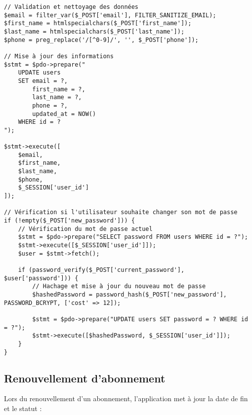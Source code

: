 \documentclass[12pt,a4paper]{report}
\begin{document}
\begin{lstlisting}[style=phpStyle, caption=Extrait de profile\_update.php - Mise à jour du profil]
// Validation et nettoyage des données
$email = filter_var($_POST['email'], FILTER_SANITIZE_EMAIL);
$first_name = htmlspecialchars($_POST['first_name']);
$last_name = htmlspecialchars($_POST['last_name']);
$phone = preg_replace('/[^0-9]/', '', $_POST['phone']);

// Mise à jour des informations
$stmt = $pdo->prepare("
    UPDATE users 
    SET email = ?, 
        first_name = ?, 
        last_name = ?, 
        phone = ?,
        updated_at = NOW()
    WHERE id = ?
");

$stmt->execute([
    $email,
    $first_name,
    $last_name,
    $phone,
    $_SESSION['user_id']
]);

// Vérification si l'utilisateur souhaite changer son mot de passe
if (!empty($_POST['new_password'])) {
    // Vérification du mot de passe actuel
    $stmt = $pdo->prepare("SELECT password FROM users WHERE id = ?");
    $stmt->execute([$_SESSION['user_id']]);
    $user = $stmt->fetch();
    
    if (password_verify($_POST['current_password'], $user['password'])) {
        // Hachage et mise à jour du nouveau mot de passe
        $hashedPassword = password_hash($_POST['new_password'], PASSWORD_BCRYPT, ['cost' => 12]);
        
        $stmt = $pdo->prepare("UPDATE users SET password = ? WHERE id = ?");
        $stmt->execute([$hashedPassword, $_SESSION['user_id']]);
    }
}
\end{lstlisting}

\subsection{Renouvellement d'abonnement}
Lors du renouvellement d'un abonnement, l'application met à jour la date de fin et le statut :
\end{document}
